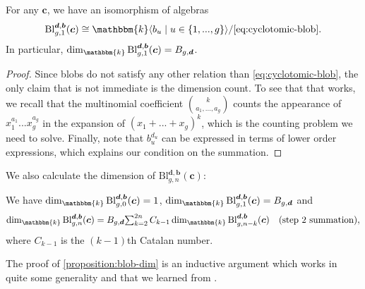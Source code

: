 \documentclass[a4paper,11pt]{amsart}
\renewcommand{\dots}{\text{...}}
\newcommand{\setstuff}[1]{\mathrm{#1}}
\newcommand{\KK}{\mathbbm{k}}
\newcommand{\bsym}[1]{\boldsymbol{#1}}
\newcommand{\cpar}{\bsym{c}}
\newcommand{\bpar}{\bsym{b}}
\newcommand{\dpar}{\bsym{d}}
\numberwithin{equation}{section}
\let\fullref\autoref
\begin{document}
\begin{lemma}\label{lemma:blob-onestrand}
For any $\cpar$, we have an isomorphism of algebras
\begin{gather*}
\setstuff{Bl}_{g,1}^{\dpar,\bpar}(\cpar)
\cong
\KK\langle b_{u}\mid u\in\{1,\dots,g\}\rangle
/\eqref{eq:cyclotomic-blob}
.
\end{gather*}
In particular, 
$\dim_{\KK}\setstuff{Bl}_{g,1}^{\dpar,\bpar}(\cpar)=B_{g,\dpar}$.
\end{lemma}

\begin{proof}
Since blobs do not satisfy any other relation than \eqref{eq:cyclotomic-blob},
the only claim that is not immediate is the dimension count. 
To see that that works, we recall that the multinomial coefficient 
$\binom{k}{a_{1},\dots,a_{g}}$
counts the appearance of $x^{a_{1}}_{1}\dots x^{a_{g}}_{g}$ in the expansion 
of $(x_{1}+\dots+x_{g})^{k}$, which is the counting problem we need to solve.
Finally, note that $b_{u}^{d_{u}}$ can be expressed in terms of
lower order expressions, which explains our condition on the summation.
\end{proof}

We also calculate the dimension of 
$\setstuff{Bl}_{g,n}^{\dpar,\bpar}(\cpar)$:

\begin{proposition}\label{proposition:blob-dim}
We have $\dim_{\KK}\setstuff{Bl}_{g,0}^{\dpar,\bpar}(\cpar)=1$, 
$\dim_{\KK}\setstuff{Bl}_{g,1}^{\dpar,\bpar}(\cpar)=B_{g,\dpar}$ and
\begin{gather}\label{eq:blob-dim}
\dim_{\KK}\setstuff{Bl}_{g,n}^{\dpar,\bpar}(\cpar)
=
B_{g,\dpar}
{\textstyle\sum_{k=2}^{2n}}\,C_{k-1}\dim_{\KK}
\setstuff{Bl}_{g,n-k}^{\dpar,\bpar}(\cpar)
\quad\text{(step $2$ summation)},
\end{gather}
where $C_{k-1}$ is the $(k-1)$th Catalan number.
\end{proposition}

The proof of \fullref{proposition:blob-dim} 
is an inductive argument which works in quite some 
generality and that we learned from \cite{tDi-sym-bridges}.
\end{document}
